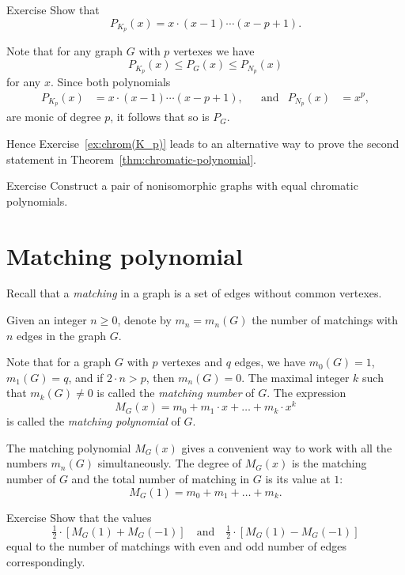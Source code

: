 \begin{thm}{Exercise}\label{ex:chrom(K_p)}
Show that 
\[P_{K_p}(x)=x\cdot(x-1)\cdots(x-p+1).\]

\end{thm}

Note that for any graph $G$ with $p$ vertexes we have
\[P_{K_p}(x)\le P_G(x)\le P_{N_p}(x)\]
for any $x$.
Since both polynomials
\begin{align*}
P_{K_p}(x)&=x\cdot(x-1)\cdots(x-p+1),&&
\text{and}
&
P_{N_p}(x)&=x^p,
\end{align*}
are monic of degree $p$,
it follows that so is $P_G$.

Hence Exercise~\ref{ex:chrom(K_p)} leads to an alternative way to prove the second statement in Theorem~\ref{thm:chromatic-polynomial}.

\begin{thm}{Exercise}
Construct a pair of nonisomorphic graphs with equal chromatic polynomials.
\end{thm}

\section*{Matching polynomial}

Recall that a \emph{matching} in a graph is a set of edges without common vertexes.

Given an integer $n\ge0$,
denote by $m_n=m_n(G)$ the number of matchings with $n$ edges in the graph $G$.

Note that for a graph $G$ with $p$ vertexes and $q$ edges, we have 
$m_0(G)=1$, 
$m_1(G)=q$, 
and if $2\cdot n>p$, then $m_n(G)=0$.
The maximal integer $k$ such that $m_k(G)\ne0$ is called the \emph{matching number} of $G$.
The expression 
\[M_G(x)=m_0+m_1\cdot x+\dots +m_k\cdot x^k\]
is called the \emph{matching polynomial} of $G$.

The matching polynomial $M_G(x)$ gives a convenient way to work with all the numbers $m_n(G)$ simultaneously.
The degree of $M_G(x)$ is the matching number of $G$ and
the total number of matching in $G$ is its value at $1$:  
\[M_G(1)=m_0+m_1+\dots +m_k.\]

\begin{thm}{Exercise}
Show that the values
\[\tfrac12\cdot[M_G(1)+ M_G(-1)]\quad\text{and}\quad\tfrac12\cdot[M_G(1)- M_G(-1)]\]
equal to the number of matchings with even and odd number of edges correspondingly.
\end{thm}

